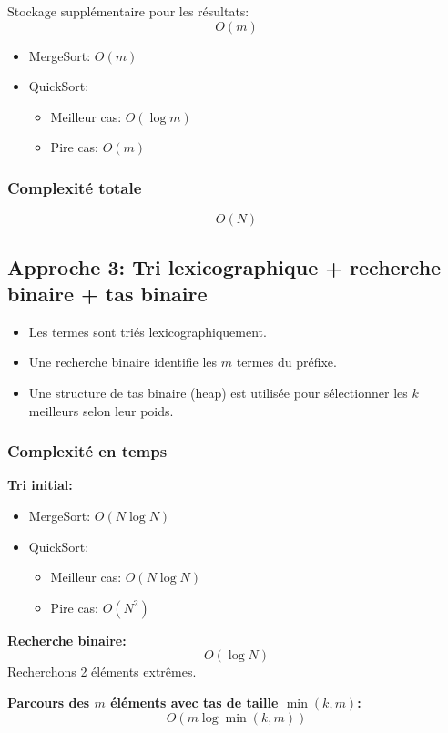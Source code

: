 Stockage supplémentaire pour les résultats:
\[
O(m)
\]

\begin{itemize}
    \item MergeSort: $O(m)$
    \item QuickSort:
    \begin{itemize}
        \item Meilleur cas: $O(\log m)$
        \item Pire cas: $O(m)$
    \end{itemize}
\end{itemize}

\subsubsection{Complexité totale}
\[
O(N)
\]

\subsection{Approche 3: Tri lexicographique + recherche binaire + tas binaire}
\begin{itemize}
    \item Les termes sont triés lexicographiquement.
    \item Une recherche binaire identifie les $m$ termes du préfixe.
    \item Une structure de tas binaire (heap) est utilisée pour sélectionner les $k$ meilleurs selon leur poids.
\end{itemize}

\subsubsection{Complexité en temps}

\textbf{Tri initial:}
\begin{itemize}
    \item MergeSort: $O(N \log N)$
    \item QuickSort:
    \begin{itemize}
        \item Meilleur cas: $O(N \log N)$
        \item Pire cas: $O(N^2)$
    \end{itemize}
\end{itemize}

\textbf{Recherche binaire:}
\[
O(\log N)
\]
Recherchons 2 éléments extrêmes.

\textbf{Parcours des $m$ éléments avec tas de taille $\min(k, m)$:}
\[
O(m \log \min(k, m))
\]

